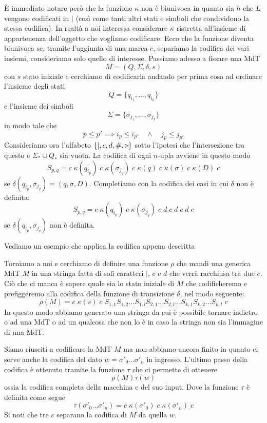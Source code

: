 \`E immediato notare però che la funzione $\kappa$ non è
biunivoca in quanto sia $h$ che $L$ vengono codificati in $\mid$
(così come tanti altri stati e simboli che condividono la stessa
codifica). In realtà a noi interessa considerare $\kappa$
ristretta all'insieme di appartenenza dell'oggetto che vogliamo
codificare. Ecco che la funzione diventa biunivoca se, tramite
l'aggiunta di una marca $c$, separiamo la codifica dei vari
insiemi, consideriamo solo quello di interesse. Passiamo adesso
a fissare una MdT
\[ M = (Q, \Sigma, \delta, s) \]
con $s$ stato iniziale e cerchiamo di codificarla andando per
prima cosa ad ordinare l'insieme degli stati
\[ Q = \{ q_{i_1}, \dots, q_{i_k} \} \]
e l'insieme dei simboli
\[ \Sigma = \{ \sigma_{j_1}, \dots, \sigma_{j_k} \} \]
in modo tale che
\[
	p \leq p' \implies i_p \leq i_{p'} \quad
	\land \quad j_p \leq j_{p'}
\]
Consideriamo ora l'alfabeto $\{ \mid, c, d, \#, \triangleright \}$ sotto
l'ipotesi che l'intersezione tra questo e $\Sigma_* \cup Q_*$
sia vuota. La codifica di ogni $n$-upla avviene in questo modo
\[
	S_{p,q} = c \; \kappa (q_{i_p})
	\; c \; \kappa (\sigma_{j_q})
	\; c \; \kappa (q)
	\; c \; \kappa (\sigma)
	\; c \; \kappa (D) \; c
\]
se $\delta (q_{i_p}, \sigma_{j_q}) = (q, \sigma, D)$. Completiamo
con la codifica dei casi in cui $\delta$ non è definita:
\[
	S_{p,q} = c \; \kappa (q_{i_p})
	\; c \; \kappa (\sigma_{j_q})
	\; c \; d \; c \; d \; c \; d \; c
\]
se $\delta(q_{i_p}, \sigma_{j_q})$ non è definita.

\begin{example}
	Vediamo un esempio che applica la codifica appena descritta
\end{example}

Torniamo a noi e cerchiamo di definire una funzione $\rho$ che
mandi una generica MdT $M$ in una stringa fatta di soli caratteri
$\mid$, $c$ e $d$ che verrà racchiusa tra due $c$. Ciò che ci
manca è sapere quale sia lo stato iniziale di $M$ che
codificheremo e prefiggeremo alla codifica della funzione di
transizione $\delta$, nel modo seguente:
\[
	\rho (M) = c \; \kappa (s) \; c \;
	S_{1,1} S_{1,2} \dots
	S_{1,l} S_{2,1} \dots S_{2,l} \dots
	S_{k,1} S_{k,2} \dots S_{k,l} \; c
\]
In questo modo abbiamo generato una stringa da cui è possibile
tornare indietro o ad una MdT o ad un qualcosa che non lo è in
caso la stringa non sia l'immagine di una MdT.

Siamo riusciti a codificare la MdT $M$ ma non abbiamo ancora
finito in quanto ci serve anche la codifica del dato
$w = \sigma'_0 \dots \sigma'_n$ in ingresso. L'ultimo passo
della codifica è ottenuto tramite la funzione $\tau$ che ci
permette di ottenere
\[ \rho(M) \tau(w) \]
ossia la codifica completa della macchina e del suo input. Dove
la funzione $\tau$ è definita come segue
\[
	\tau(\sigma'_0 \dots \sigma'_n) =
	c \; \kappa(\sigma'_0) \;
	c \; \kappa(\sigma'_n) \; c
\]
Si noti che tre $c$ separano la codifica di $M$ da quella $w$.

